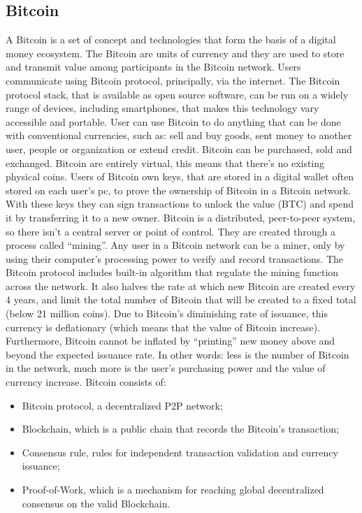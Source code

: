 \documentclass{article}
\begin{document}
\subsection*{Bitcoin}
A Bitcoin is a set of concept and technologies that form the basis of a digital money ecosystem. The Bitcoin are units of currency and they are used to store and transmit value among participants in the Bitcoin network. Users communicate using Bitcoin protocol, principally, via the internet. The Bitcoin protocol stack, that is available as open source software, can be run on a widely range of devices, including smartphones, that makes this technology vary accessible and portable.\newline
User can use Bitcoin to do anything that can be done with conventional currencies, such as: sell and buy goods, sent money to another user, people or organization or extend credit. Bitcoin can be purchased, sold and exchanged. Bitcoin are entirely virtual, this means that there's no existing physical coins. Users of Bitcoin own keys, that are stored in a digital wallet often stored on each user’s pc, to prove the ownership of Bitcoin in a Bitcoin network. With these keys they can sign transactions to unlock the value (BTC) and spend it by transferring it to a new owner.\newline
Bitcoin is a distributed, peer-to-peer system, so there isn’t a central server or point of control. They are created through a process called “mining”. Any user in a Bitcoin network can be a miner, only by using their computer’s processing power to verify and record transactions.\newline
The Bitcoin protocol includes built-in algorithm that regulate the mining function across the network. It also halves the rate at which new Bitcoin are created every 4 years, and limit the total number of Bitcoin that will be created to a fixed total (below 21 million coins).\newline
Due to Bitcoin’s diminishing rate of issuance, this currency is deflationary (which means that the value of Bitcoin increase). Furthermore, Bitcoin cannot be inflated by “printing” new money above and beyond the expected issuance rate.\newline
In other words: less is the number of Bitcoin in the network, much more is the user’s purchasing power and the value of currency increase. Bitcoin consists of:
\begin{itemize}
    \item Bitcoin protocol, a decentralized P2P network;
    \item Blockchain, which is a public chain that records the Bitcoin’s transaction;
    \item Consensus rule, rules for independent transaction validation and currency issuance;
    \item Proof-of-Work, which is a mechanism for reaching global decentralized
consensus on the valid Blockchain.
\end{itemize}
\end{document}
